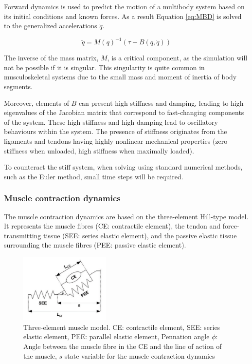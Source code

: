 Forward dynamics is used to predict the motion of a multibody system based on its initial conditions and known forces. As a result Equation \ref{eq:MBD} is solved to the generalized accelerations $\ddot{q}$.

\begin{equation}
    \ddot{q} = M(q)^{-1}(\tau - B(q,\dot{q}))
\end{equation}

The inverse of the mass matrix, $M$, is a critical component, as the simulation will not be possible if it is singular. This singularity is quite common in musculoskeletal systems due to the small mass and moment of inertia of body segments.

Moreover, elements of $B$ can present high stiffness and damping, leading to high eigenvalues of the Jacobian matrix that correspond to fast-changing components of the system. These high stiffness and high damping lead to oscillatory behaviours within the system. The presence of stiffness originates from the ligaments and tendons having highly nonlinear mechanical properties (zero stiffness when unloaded, high stiffness when maximally loaded).

To counteract the stiff system, when solving using standard numerical methods, such as the Euler method,  small time steps will be required.


\subsubsection{Muscle contraction dynamics} \label{musclecontraction}

The muscle contraction dynamics are based on the three-element Hill-type model. It represents the muscle fibres (CE: contractile element), the tendon and force-transmitting tissue (SEE: series elastic element), and the passive elastic tissue surrounding the muscle fibres (PEE: passive elastic element). 
\begin{figure}[h!]
    \centering
\includegraphics[width=0.4\textwidth]{Pictures/DAS/Hill-Type_MuscleModel.png}
    \caption{Three-element muscle model. CE: contractile element, SEE: series elastic element, PEE: parallel elastic element, Pennation angle $\phi$: Angle between the muscle fibre in the CE and the line of action of the muscle, $s$ state variable for the muscle contraction dynamics \cite{IMP}}
    \label{fig:Hill-type}
\end{figure}

